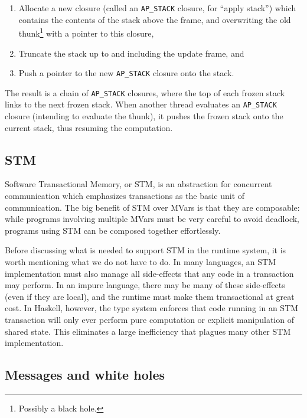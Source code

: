 \begin{enumerate}
    \item Allocate a new closure (called an \verb|AP_STACK| closure, for
        ``apply stack'') which contains the contents of the stack above
        the frame, and overwriting the old thunk\footnote{Possibly a
        black hole.} with a pointer to this closure,
    \item Truncate the stack up to and including the update frame, and
    \item Push a pointer to the new \verb|AP_STACK| closure onto the stack.
\end{enumerate}

The result is a chain of \verb|AP_STACK| closures, where the top of each
frozen stack links to the next frozen stack.  When another thread
evaluates an \verb|AP_STACK| closure (intending to evaluate the thunk),
it pushes the frozen stack onto the current stack, thus resuming the
computation.

\subsection{STM}

Software Transactional Memory, or STM, is an abstraction for concurrent
communication which emphasizes transactions as the basic unit of
communication.  The big benefit of STM over MVars is that they are
composable: while programs involving multiple MVars must be very careful
to avoid deadlock, programs using STM can be composed together
effortlessly.

Before discussing what is needed to support STM in the runtime system,
it is worth mentioning what we do not have to do.  In many languages,
an STM implementation must also manage all side-effects that any code
in a transaction may perform.  In an impure language, there may be many
of these side-effects (even if they are local), and the runtime must
make them transactional at great cost.  In Haskell, however, the type system
enforces that code running in an STM transaction will only ever perform
pure computation or explicit manipulation of shared state.  This eliminates
a large inefficiency that plagues many other STM implementation.



\subsection{Messages and white holes}

